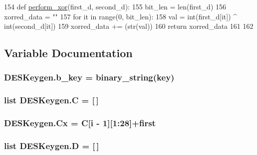 \begin{DoxyCode}
154 \textcolor{keyword}{def }\hyperlink{namespaceDESKeygen_ad8cc7c44b9ccc58a64ae4794d018024a}{perform\_xor}(first\_d, second\_d):
155     bit\_len = len(first\_d)
156     xorred\_data = \textcolor{stringliteral}{""}
157     \textcolor{keywordflow}{for} it \textcolor{keywordflow}{in} range(0, bit\_len):
158         val = int(first\_d[it]) ^ int(second\_d[it])
159         xorred\_data += (str(val))
160     \textcolor{keywordflow}{return} xorred\_data
161 
162 
\end{DoxyCode}


\subsection{Variable Documentation}
\subsubsection[{\texorpdfstring{b\+\_\+key}{b_key}}]{\setlength{\rightskip}{0pt plus 5cm}D\+E\+S\+Keygen.\+b\+\_\+key = {\bf binary\+\_\+string}({\bf key})}\hypertarget{namespaceDESKeygen_a306ed33120176dbe79619181f9879730}{}\label{namespaceDESKeygen_a306ed33120176dbe79619181f9879730}
\subsubsection[{\texorpdfstring{C}{C}}]{\setlength{\rightskip}{0pt plus 5cm}list D\+E\+S\+Keygen.\+C = \mbox{[}$\,$\mbox{]}}\hypertarget{namespaceDESKeygen_a393699eacc46d06903f450fee13ab916}{}\label{namespaceDESKeygen_a393699eacc46d06903f450fee13ab916}
\subsubsection[{\texorpdfstring{Cx}{Cx}}]{\setlength{\rightskip}{0pt plus 5cm}D\+E\+S\+Keygen.\+Cx = {\bf C}\mbox{[}i -\/ 1\mbox{]}\mbox{[}1\+:28\mbox{]}+{\bf first}}\hypertarget{namespaceDESKeygen_a0236231f847a50ccf8bb110023c5e22d}{}\label{namespaceDESKeygen_a0236231f847a50ccf8bb110023c5e22d}
\subsubsection[{\texorpdfstring{D}{D}}]{\setlength{\rightskip}{0pt plus 5cm}list D\+E\+S\+Keygen.\+D = \mbox{[}$\,$\mbox{]}}\hypertarget{namespaceDESKeygen_a4618ae9ac43c9af4a7a018eae1507c3c}{}\label{namespaceDESKeygen_a4618ae9ac43c9af4a7a018eae1507c3c}
